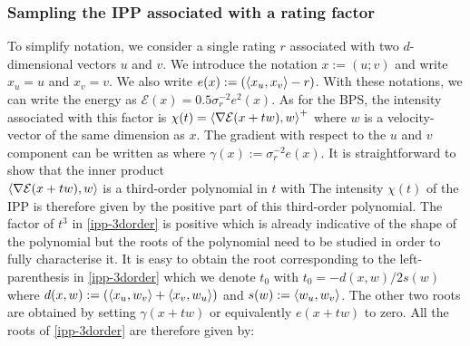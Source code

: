 \subsubsection{Sampling the IPP associated with a rating factor}

To simplify notation, we consider a single rating $r$ associated with two $d$-dimensional vectors $u$ and $v$. We introduce the notation $x:=(u; v)$ and write $x_{u}=u$ and $x_{v}=v$. We also write $e(x):=(\left\langle x_{u},x_{v} \right\rangle-r)$. With these notations, we can write the energy as $\mathcal E(x) = 0.5\sigma_{r}^{-2}e^{2}(x)$. 
As for the BPS, the intensity associated with this factor is $\chi(t) = \left\langle \nabla \mathcal E(x+tw), w \right\rangle^{+}$ where $w$ is a velocity-vector of the same dimension as $x$. The gradient with respect to the $u$ and $v$ component can be written as
where $\gamma(x):=\sigma_{r}^{-2}e(x)$. It is straightforward to show that the inner product \\$\left\langle \nabla\mathcal E(x+tw), w \right\rangle$ is a third-order polynomial in $t$ with
The intensity $\chi(t)$ of the IPP is therefore given by the positive part of this third-order polynomial. The factor of $t^{3}$ in \eqref{ipp-3dorder} is positive which is already indicative of the shape of the polynomial but the roots of the polynomial need to be studied in order to fully characterise it. It is easy to obtain the root corresponding to the left-parenthesis in \eqref{ipp-3dorder} which we denote $t_{0}$ with $t_{0}=-d(x,w)/2s(w)$ where $d(x,w):=(\left\langle x_{u}, w_{v} \right\rangle+\left\langle x_{v},w_{u} \right\rangle)$ and $s(w):=\left\langle w_{u},w_{v} \right\rangle$. The other two roots are obtained by setting $\gamma(x+tw)$ or equivalently $e(x+tw)$ to zero. All the roots of \eqref{ipp-3dorder} are therefore given by:

